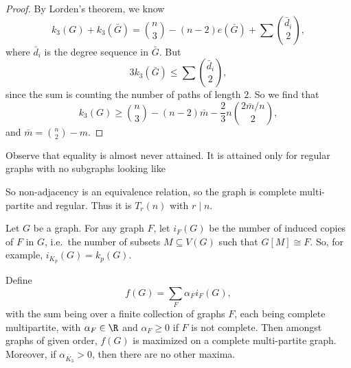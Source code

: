 \documentclass[a4paper]{article}
\begin{document}
\begin{proof}
  By Lorden's theorem, we know
  \[
    k_3(G) + k_3(\bar{G}) = \binom{n}{3} - (n - 2) e(\bar{G}) + \sum\binom{\bar{d}_i}{2},
  \]
  where $\bar{d}_i$ is the degree sequence in $\bar{G}$. But
  \[
    3 k_3(\bar{G}) \leq \sum \binom{\bar{d}_i}{2},
  \]
  since the sum is counting the number of paths of length $2$. So we find that
  \[
    k_3(G) \geq \binom{n}{3} - (n - 2)\bar{m} - \frac{2}{3}n \binom{2 \bar{m}/n}{2},
  \]
  and $\bar{m} = \binom{n}{2} - m$.
\end{proof}
Observe that equality is almost never attained. It is attained only for regular graphs with no subgraphs looking like
\begin{center}
\end{center}
So non-adjacency is an equivalence relation, so the graph is complete multi-partite and regular. Thus it is $T_r(n)$ with $r \mid n$.

\begin{thm}
  Let $G$ be a graph. For any graph $F$, let $i_F(G)$ be the number of induced copies of $F$ in $G$, i.e.\ the number of subsets $M \subseteq V(G)$ such that $G[M] \cong F$. So, for example, $i_{K_p}(G) = k_p(G)$.

  Define
  \[
    f(G) = \sum_F \alpha_F i_F(G),
  \]
  with the sum being over a finite collection of graphs $F$, each being complete multipartite, with $\alpha_F \in \R$ and $\alpha_F \geq 0$ if $F$ is not complete. Then amongst graphs of given order, $f(G)$ is maximized on a complete multi-partite graph. Moreover, if $\alpha_{\bar{K}_3} > 0$, then there are no other maxima.
\end{thm}
\end{document}

